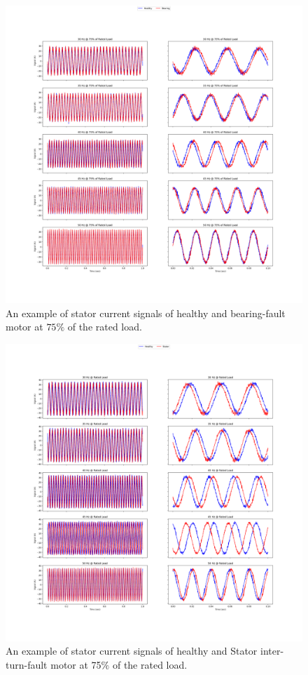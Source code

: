 \begin{figure}[h]
	\centering
	\includegraphics[width=0.8\paperwidth,keepaspectratio=true]{./fig/bearing_75.png}
	\caption{An example of stator current signals of healthy and bearing-fault motor at $75\%$ of the rated load.}	
	\label{bearing75}
\end{figure}
\pagebreak
\begin{figure}[h]
	\centering
	\includegraphics[width=0.8\paperwidth,keepaspectratio=true]{./fig/stator_100.png}
	\caption{An example of stator current signals of healthy and Stator inter-turn-fault motor at 75$\%$ of the rated load.}	
	\label{stator100}
\end{figure}
